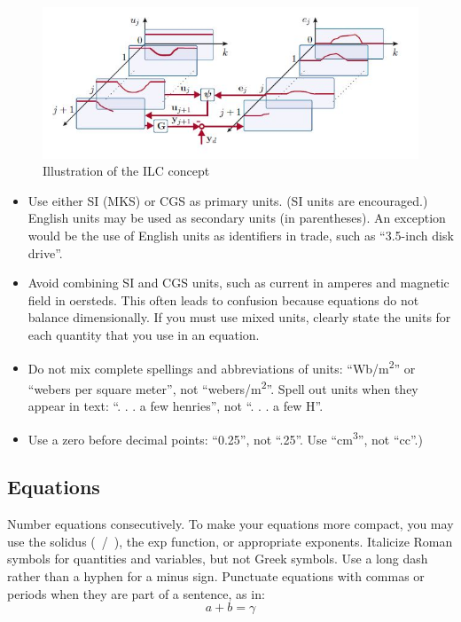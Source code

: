 \documentclass[conference]{IEEEtran}
\begin{document}
\begin{figure}[tbp]
\centerline{\includegraphics{./pictures/ILCillu.jpg}}
\caption{Illustration of the ILC concept \cite{ILCGlueck2015}}
\label{fig:illuILC}
\end{figure}

\begin{itemize}
\item Use either SI (MKS) or CGS as primary units. (SI units are
  encouraged.) English units may be used as secondary units (in
  parentheses). An exception would be the use of English units as
  identifiers in trade, such as ``3.5-inch disk drive''.
\item Avoid combining SI and CGS units, such as current in amperes and
  magnetic field in oersteds. This often leads to confusion because
  equations do not balance dimensionally. If you must use mixed units,
  clearly state the units for each quantity that you use in an
  equation.
\item Do not mix complete spellings and abbreviations of units:
  ``Wb/m\textsuperscript{2}'' or ``webers per square meter'', not
  ``webers/m\textsuperscript{2}''. Spell out units when they appear in
  text: ``. . . a few henries'', not ``. . . a few H''.
\item Use a zero before decimal points: ``0.25'', not ``.25''. Use
  ``cm\textsuperscript{3}'', not ``cc''.)
\end{itemize}

\subsection{Equations}
Number equations consecutively. To make your equations more compact,
you may use the solidus (~/~), the exp function, or appropriate
exponents. Italicize Roman symbols for quantities and variables, but
not Greek symbols. Use a long dash rather than a hyphen for a minus
sign. Punctuate equations with commas or periods when they are part of
a sentence, as in:
\begin{equation}
a+b=\gamma\label{eq}
\end{equation}
\end{document}
